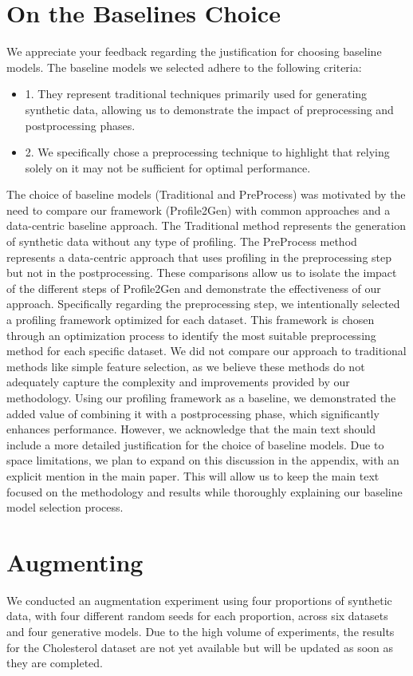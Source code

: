 \documentclass{article}
\theoremstyle{plain}
\theoremstyle{definition}
\theoremstyle{remark}
\begin{document}
\section{On the Baselines Choice}\label{appsec:choice}
We appreciate your feedback regarding the justification for choosing baseline models. The baseline models we selected adhere to the following criteria:
\begin{itemize}
    \item 1. They represent traditional techniques primarily used for generating synthetic data, allowing us to demonstrate the impact of preprocessing and postprocessing phases.
    \item  2. We specifically chose a preprocessing technique to highlight that relying solely on it may not be sufficient for optimal performance.
\end{itemize}
  The choice of baseline models (Traditional and PreProcess) was motivated by the need to compare our framework (Profile2Gen) with common approaches and a data-centric baseline approach. The Traditional method represents the generation of synthetic data without any type of profiling. The PreProcess method represents a data-centric approach that uses profiling in the preprocessing step but not in the postprocessing. These comparisons allow us to isolate the impact of the different steps of Profile2Gen and demonstrate the effectiveness of our approach. Specifically regarding the preprocessing step, we intentionally selected a profiling framework optimized for each dataset. This framework is chosen through an optimization process to identify the most suitable preprocessing method for each specific dataset. We did not compare our approach to traditional methods like simple feature selection, as we believe these methods do not adequately capture the complexity and improvements provided by our methodology. Using our profiling framework as a baseline, we demonstrated the added value of combining it with a postprocessing phase, which significantly enhances performance. However, we acknowledge that the main text should include a more detailed justification for the choice of baseline models. Due to space limitations, we plan to expand on this discussion in the appendix, with an explicit mention in the main paper. This will allow us to keep the main text focused on the methodology and results while thoroughly explaining our baseline model selection process. 

\section{Augmenting} \label{sec:sug_supp}
We conducted an augmentation experiment using four proportions of synthetic data, with four different random seeds for each proportion, across six datasets and four generative models. Due to the high volume of experiments, the results for the Cholesterol dataset are not yet available but will be updated as soon as they are completed.
\end{document}
